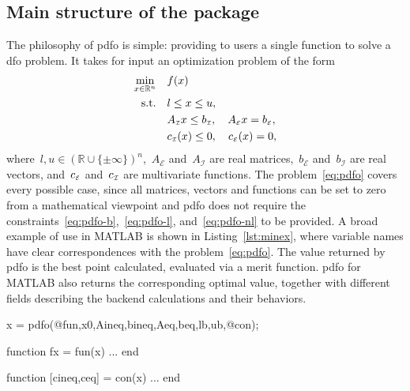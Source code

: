 \documentclass[
    smallextended,  %
    draft,          %
]{svjour3}
\newcommand{\R}{\mathbb{R}}
\newcommand{\aeq}{A_{\scriptscriptstyle\mathcal{E}}}
\newcommand{\aub}{A_{\scriptscriptstyle\mathcal{I}}}
\newcommand{\beq}{b_{\scriptscriptstyle\mathcal{E}}}
\newcommand{\bub}{b_{\scriptscriptstyle\mathcal{I}}}
\newcommand{\ceq}{\con[\scriptscriptstyle\mathcal{E}]}
\newcommand{\con}[1][i]{c\ifthenelse{\equal{#1}{}}{}{_{#1}}}
\newcommand{\cub}{\con[\scriptscriptstyle\mathcal{I}]}
\newcommand{\obj}{f}
\newcommand{\set}[2][]{#1\{#2#1\}}
\newcommand{\st}{\text{s.t.}}
\newcommand{\xl}{l}
\newcommand{\xu}{u}
\begin{document}
\subsection{Main structure of the package}

The philosophy of \gls{pdfo} is simple: providing to users a single function to solve a \gls{dfo} problem.
It takes for input an optimization problem of the form
\begin{subequations}
    \label{eq:pdfo}
    \begin{align}
        \min_{x \in \R^n}   & \quad \obj(x)\\
        \st                 & \quad \xl \le x \le \xu, \label{eq:pdfo-b}\\
                            & \quad \aub x \le \bub, \quad \aeq x = \beq, \label{eq:pdfo-l}\\
                            & \quad \cub(x) \le 0, \quad \ceq(x) = 0, \label{eq:pdfo-nl}
    \end{align}
\end{subequations}
where~$\xl, \xu \in (\R \cup \set{\pm \infty})^n$,~$\aeq$ and~$\aub$ are real matrices,~$\beq$ and~$\bub$ are real vectors, and~$\ceq$ and~$\cub$ are multivariate functions.
The problem~\eqref{eq:pdfo} covers every possible case, since all matrices, vectors and functions can be set to zero from a mathematical viewpoint and \gls{pdfo} does not require the constraints~\eqref{eq:pdfo-b},~\eqref{eq:pdfo-l}, and~\eqref{eq:pdfo-nl} to be provided.
A broad example of use in MATLAB is shown in Listing~\ref{lst:minex}, where variable names have clear correspondences with the problem~\eqref{eq:pdfo}.
The value returned by \gls{pdfo} is the best point calculated, evaluated via a merit function.
\Gls{pdfo} for MATLAB also returns the corresponding optimal value, together with different fields describing the backend calculations and their behaviors.

\begin{matlablst}[%
    caption=An elementary example of \gls{pdfo} in MATLAB,
    label=lst:minex
]
    x = pdfo(@fun,x0,Aineq,bineq,Aeq,beq,lb,ub,@con);

    function fx = fun(x)
    ...
    end

    function [cineq,ceq] = con(x)
    ...
    end
\end{matlablst}
\end{document}
